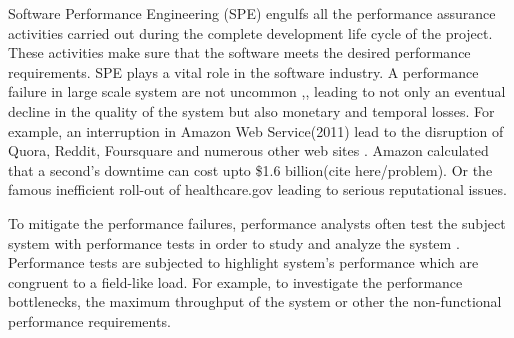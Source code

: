 Software Performance Engineering (SPE)  engulfs all the performance assurance activities carried out during the complete development life cycle of the project. These activities make sure that the software meets the desired performance requirements\cite{futureofspe}. SPE plays a vital role in the software industry. A performance failure in large scale system are not uncommon \cite{tailatscale},\cite{foo2010mining}, leading to not only an eventual decline in the quality of the system but also monetary and temporal losses\cite{costofdowntime}. For example, an interruption in Amazon Web Service(2011) lead to the disruption of Quora, Reddit, Foursquare and numerous other web sites \cite{amazondown}. Amazon calculated that a second's downtime can cost upto \$1.6 billion(cite here/problem). Or the famous inefficient roll-out of healthcare.gov \cite{healthcare} leading to serious reputational issues.


To mitigate the performance failures, performance analysts often test the subject system with performance tests in order to study and analyze the system \cite{futureofspe}. Performance tests are subjected to highlight system's performance which are congruent to a field-like load\cite{Shang:2015:ADP:2668930.2688052}. For example, to investigate the performance bottlenecks, the maximum throughput of the system \cite{syer2014maintenance} or other the non-functional performance requirements.


